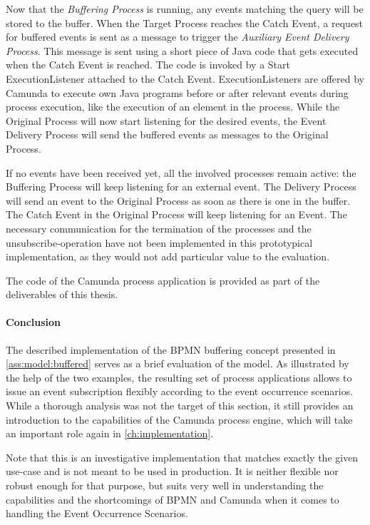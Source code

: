 Now that the \textit{Buffering Process} is running, any events matching the query will be stored to the buffer.
When the Target Process reaches the Catch Event, a request for buffered events is sent as a message to trigger the \textit{Auxiliary Event Delivery Process}.
This message is sent using a short piece of Java code that gets executed when the Catch Event is reached. 
The code is invoked by a Start ExecutionListener attached to the Catch Event. ExecutionListeners are offered by Camunda to execute own Java programs before or after relevant events during process execution, like the execution of an element in the process.
While the Original Process will now start listening for the desired events, the Event Delivery Process will send the buffered events as messages to the Original Process.

If no events have been received yet, all the involved processes remain active: the Buffering Process will keep listening for an external event. The Delivery Process will send an event to the Original Process as soon as there is one in the buffer. The Catch Event in the Original Process will keep listening for an Event.
The necessary communication for the termination of the processes and the unsubscribe-operation have not been implemented in this prototypical implementation, as they would not add particular value to the evaluation.

The code of the Camunda process application is provided as part of the deliverables of this thesis.


\paragraph{Conclusion}
The described implementation of the BPMN buffering concept presented in \autoref{ass:model:buffered} serves as a brief evaluation of the model. As illustrated by the help of the two examples, the resulting set of process applications allows to issue an event subscription flexibly according to the event occurrence scenarios.
While a thorough analysis was not the target of this section, it still provides an introduction to the capabilities of the Camunda process engine, which will take an important role again in \ref{ch:implementation}.


Note that this is an investigative implementation that matches exactly the given use-case and is not meant to be used in production. It is neither flexible nor robust enough for that purpose, but suits very well in understanding the capabilities and the shortcomings of BPMN and Camunda when it comes to handling the Event Occurrence Scenarios.

